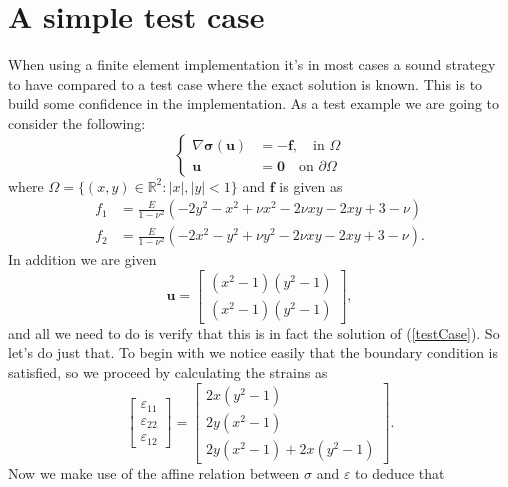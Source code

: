 \documentclass[paper=a4, fontsize=11pt]{scrartcl} %
\begin{document}
\section*{A simple test case}
When using a finite element implementation it's in most cases a sound strategy to have compared to a test case where the exact solution is known. This is to build some confidence in the implementation. As a test example we are going to consider the following:
\begin{equation}
\label{testCase}
\begin{cases}\nabla \boldsymbol{\sigma}(\boldsymbol{u}) &= -\boldsymbol{f}, \quad \text{in } \Omega \\
\boldsymbol{u} &= \boldsymbol{0} \quad \text{on } \partial \Omega
\end{cases}
\end{equation}
where $\Omega = \{(x,y)\in \mathbb{R}^2: |x|,|y|<1\}$ and $\boldsymbol{f}$ is given as
\begin{align*}
f_1 &= \frac{E}{1-\nu^2}\left(-2y^2-x^2+\nu x^2-2\nu xy - 2xy + 3 - \nu\right) \\
f_2 &= \frac{E}{1-\nu^2}\left(-2x^2-y^2+\nu y^2-2\nu xy - 2xy + 3 - \nu\right).
\end{align*}
In addition we are given
\begin{equation*}
\boldsymbol{u} = \begin{bmatrix}
(x^2-1)(y^2-1) \\ (x^2-1)(y^2-1)
\end{bmatrix},
\end{equation*}
and all we need to do is verify that this is in fact the solution of (\ref{testCase}). So let's do just that. To begin with we notice easily that the boundary condition is satisfied, so we proceed by calculating the strains as
\begin{equation*}
\begin{bmatrix}
\varepsilon_{11} \\
\varepsilon_{22} \\
\varepsilon_{12}
\end{bmatrix}
=
\begin{bmatrix}
2x(y^2-1) \\
2y(x^2-1) \\
2y(x^2-1)+2x(y^2-1)
\end{bmatrix}.
\end{equation*}
Now we make use of the affine relation between $\sigma$ and $\varepsilon$ to deduce that
\end{document}
